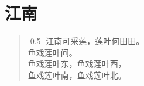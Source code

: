 \documentclass[12pt,UTF-8,openany]{ctexbook}
\begin{document}
\hanzibox{}\hanzibox{}\hanzibox{}\hanzibox{}\hspace{1em}\hanzibox{}\hanzibox{}\hanzibox{}\hanzibox{}

\hanzibox{}\hanzibox{}\hanzibox{}\hanzibox{}\hspace{1em}\hanzibox{}\hanzibox{}\hanzibox{}\hanzibox{}

\hanzibox{}\hanzibox{}\hanzibox{}\hanzibox{}\hspace{1em}\hanzibox{}\hanzibox{}\hanzibox{}\hanzibox{}

\hanzibox{}\hanzibox{}\hanzibox{}\hanzibox{}\hspace{1em}\hanzibox{}\hanzibox{}\hanzibox{}\hanzibox{}






\chapter{江南}

\begin{large}
    
    \begin{verse}[0.5\linewidth]
        江南可采莲，莲叶何田田。 \\
        鱼戏莲叶间。 \\
        鱼戏莲叶东，鱼戏莲叶西， \\
        鱼戏莲叶南，鱼戏莲叶北。
    \end{verse}
    
\end{large}


\clearpage

\begin{center}
    
\end{center}


\hanzibox{}\hanzibox{}\hanzibox{}\hanzibox{}\hspace{1em}\hanzibox{}\hanzibox{}\hanzibox{}\hanzibox{}

\hanzibox{}\hanzibox{}\hanzibox{}\hanzibox{}\hspace{1em}\hanzibox{}\hanzibox{}\hanzibox{}\hanzibox{}

\hanzibox{}\hanzibox{}\hanzibox{}\hanzibox{}\hspace{1em}
\end{document}
